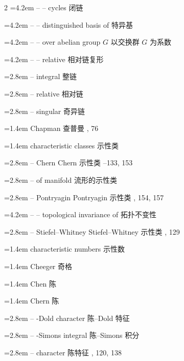 \begin{multicols}{2}
\noindent\hangindent=4.2em -- -- cycles \quad 闭链 \par
\noindent\hangindent=4.2em -- -- distinguished basis of \quad 特异基 \par
\noindent\hangindent=4.2em -- -- over abelian group $G$ \quad 以交换群 $G$ 为系数 \par
\noindent\hangindent=4.2em -- -- relative \quad 相对链复形 \par
\noindent\hangindent=2.8em -- integral \quad 整链 \par
\noindent\hangindent=2.8em -- relative \quad 相对链 \par
\noindent\hangindent=2.8em -- singular \quad 奇异链 \par
\noindent\hangindent=1.4em Chapman \quad 查普曼 , 76\par
\noindent\hangindent=1.4em characteristic classes \quad 示性类 \par
\noindent\hangindent=2.8em -- Chern \quad Chern 示性类 --133, 153\par
\noindent\hangindent=2.8em -- of manifold \quad 流形的示性类 \par
\noindent\hangindent=2.8em -- Pontryagin \quad Pontryagin 示性类 , 154, 157\par
\noindent\hangindent=4.2em -- -- topological invariance of \quad 拓扑不变性 \par
\noindent\hangindent=2.8em -- Stiefel--Whitney \quad Stiefel--Whitney 示性类 , 129\par
\noindent\hangindent=1.4em characteristic numbers \quad 示性数 \par
\noindent\hangindent=1.4em Cheeger \quad 奇格 \par
\noindent\hangindent=1.4em Chen \quad 陈 \par
\noindent\hangindent=1.4em Chern \quad 陈 \par
\noindent\hangindent=2.8em -- -Dold character \quad 陈--Dold 特征 \par
\noindent\hangindent=2.8em -- -Simons integral \quad 陈--Simons 积分 \par
\noindent\hangindent=2.8em -- character \quad 陈特征 , 120, 138\par

\end{multicols}
